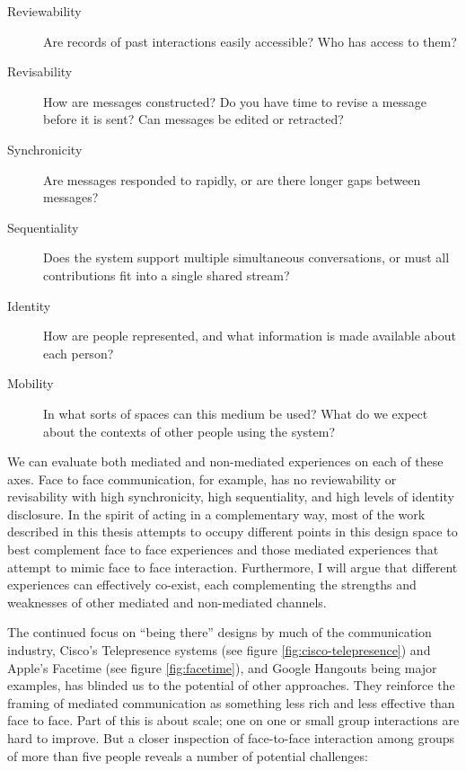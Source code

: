 \begin{description}
\item [Reviewability]{Are records of past interactions easily accessible? Who has access to them?}
\item [Revisability]{How are messages constructed? Do you have time to revise a message before it is sent? Can messages be edited or retracted?}
\item [Synchronicity]{Are messages responded to rapidly, or are there longer gaps between messages?}
\item [Sequentiality]{Does the system support multiple simultaneous conversations, or must all contributions fit into a single shared stream?}
\item [Identity]{How are people represented, and what information is made available about each person?}
\item [Mobility]{In what sorts of spaces can this medium be used? What do we expect about the contexts of other people using the system?}
\end{description}


We can evaluate both mediated and non-mediated experiences on each of these axes. Face to face communication, for example, has no reviewability or revisability with high synchronicity, high sequentiality, and high levels of identity disclosure. In the spirit of acting in a complementary way, most of the work described in this thesis attempts to occupy different points in this design space to best complement face to face experiences and those mediated experiences that attempt to mimic face to face interaction. Furthermore, I will argue that different experiences can effectively co-exist, each complementing the strengths and weaknesses of other mediated and non-mediated channels.

The continued focus on ``being there'' designs by much of the communication industry, Cisco's Telepresence systems (see figure \ref{fig:cisco-telepresence}) and Apple's Facetime (see figure \ref{fig:facetime}), and Google Hangouts being major examples, has blinded us to the potential of other approaches. They reinforce the framing of mediated communication as something less rich and less effective than face to face. Part of this is about scale; one on one or small group interactions are hard to improve. But a closer inspection of face-to-face interaction among groups of more than five people reveals a number of potential challenges:


